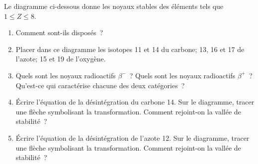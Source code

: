 \begin{minipage}{0.61\linewidth}
Le diagramme ci-dessous donne les noyaux stables des éléments tels que
$1\leqslant Z\leqslant8$.

    \begin{enumerate}
    \item Comment sont-ils disposés~?
    \item Placer dans ce diagramme les isotopes 11 et 14 du carbone; 13, 16 et
          17 de l'azote; 15 et 19 de l'oxygène.
    \item Quels sont les noyaux radioactifs $\beta^{-}$~? Quels sont les noyaux
          radioactifs $\beta^{+}$~? Qu'est-ce qui caractérise chacune des deux
          catégories~?
    \item Écrire l'équation de la désintégration du carbone 14. Sur le
          diagramme, tracer une flèche symbolisant la transformation. Comment
          rejoint-on la vallée de stabilité~?
    \item Écrire l'équation de la désintégration de l'azote 12. Sur le
          diagramme, tracer une flèche symbolisant la transformation. Comment
          rejoint-on la vallée de stabilité~?
\end{enumerate}
\end{minipage}
\hfill
